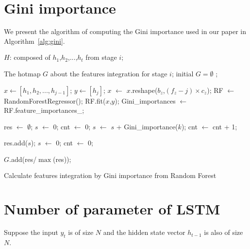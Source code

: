 \documentclass[letterpaper]{article} \usepackage{aaai20}  \usepackage{times}  \usepackage{helvet} \usepackage{courier}  \usepackage[hyphens]{url}  \usepackage{graphicx} \urlstyle{rm} \def\UrlFont{\rm}  \usepackage{graphicx}  \frenchspacing  \setlength{\pdfpagewidth}{8.5in}  \setlength{\pdfpageheight}{11in}  \usepackage{color}
\begin{document}
	
	\section{Gini importance}
	We present the algorithm of computing the Gini importance used in our paper in Algorithm~\ref{alg:gini}.
	
	\begin{algorithm}[h]  
		\begin{algorithmic}[1]  
			\Require  
			$H$: composed of $h_1$,$h_2$,...,$h_t$ from stage $i$;
			
			{\color[RGB]{162,205,133}{\#The size of $H$ is ($b_z \times c_z \times f_z$)}}
			
			{\color[RGB]{162,205,133}{\#$b_z$ denotes the batch size of $h_t$}}
			
			{\color[RGB]{162,205,133}{\#$c_z$ denotes the number of the feature maps' channel in current stage}}
			
			{\color[RGB]{162,205,133}{\#$f_z$ denotes the number of layers in current stage}}
			
			\Ensure  
			The hotmap $G$ about the features integration for stage $i$;
			\State initial  $G = \emptyset$ ; 
			
			\State $x \gets [h_1,h_2,...,h_{j-1}]$;
			\State $y  \gets [h_j]$;
			\State $x$ $\gets$ $x$.reshape($b_z$,$(f_z - j) \times c_z$);
			\State RF $\gets$ RandomForestRegressor();
			\State RF.fit($x$,$y$);
			\State Gini\_importances $\gets$ RF.feature\_importances\_;
			
			
			{\color[RGB]{162,205,133}{\#The length of Gini\_importance is $(f_z - j) \times c_z$}}
			
			
			\State res $\gets$ $\emptyset$; 
			\State $s$ $\gets$ 0; 
			\State cnt $\gets$ 0;
			\State $s$ $\gets$ $s$ + Gini\_importance($k$);
			\State cnt $\gets$ cnt + 1;
			
			\State res.add($s$);
			\State $s$ $\gets$ 0;
			\State cnt $\gets$ 0;
			\EndIf  
			
			$G$.add(res/$\max$(res));
			
			\EndFor
			
			\EndFor  
			
		\end{algorithmic}  
		\caption{Calculate features integration by Gini importance from Random Forest}  
		\label{alg:gini}  
	\end{algorithm}  
	
	
	\section{Number of parameter of LSTM}
	Suppose the input $y_t$ is of size $N$ and the hidden state vector $h_{t-1}$ is also of size $N$.
	
\end{document}
